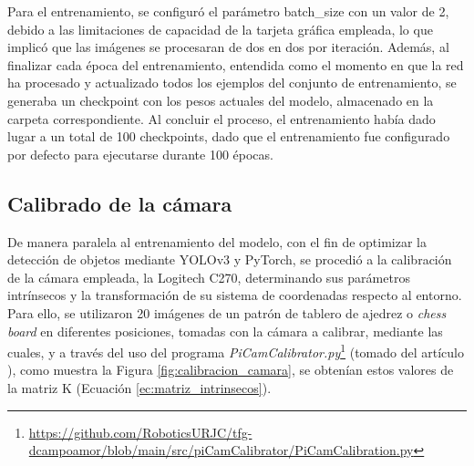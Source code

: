 Para el entrenamiento, se configuró el parámetro batch\_size con un valor de 2, debido a las limitaciones de capacidad de la tarjeta gráfica empleada, lo que implicó que las imágenes se procesaran de dos en dos por iteración. Además, al finalizar cada época del entrenamiento, entendida como el momento en que la red ha procesado y actualizado todos los ejemplos del conjunto de entrenamiento, se generaba un checkpoint con los pesos actuales del modelo, almacenado en la carpeta correspondiente. Al concluir el proceso, el entrenamiento había dado lugar a un total de 100 checkpoints, dado que el entrenamiento fue configurado por defecto para ejecutarse durante 100 épocas.

\subsection{Calibrado de la cámara}
\label{sec:Calibrado_camara}

De manera paralela al entrenamiento del modelo, con el fin de optimizar la detección de objetos mediante YOLOv3 y PyTorch, se procedió a la calibración de la cámara empleada, la Logitech C270, determinando sus parámetros intrínsecos y la transformación de su sistema de coordenadas respecto al entorno. Para ello, se utilizaron 20 imágenes de un patrón de tablero de ajedrez o \textit{chess board} en diferentes posiciones, tomadas con la cámara a calibrar, mediante las cuales, y a través del uso del programa \textit{PiCamCalibrator.py}\footnote{\url{https://github.com/RoboticsURJC/tfg-dcampoamor/blob/main/src/piCamCalibrator/PiCamCalibration.py}} (tomado del artículo \cite{Vega21}), como muestra la Figura \ref{fig:calibracion_camara}, se obtenían estos valores de la matriz K (Ecuación \ref{ec:matriz_intrinsecos}). 

